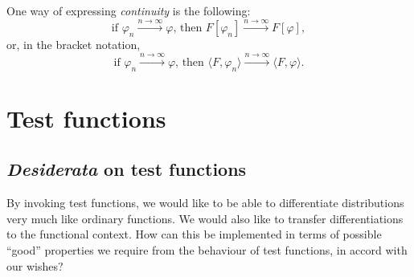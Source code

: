 One way of expressing {\em continuity} is
 the following:
\begin{equation}
\textrm{if }
\varphi_n \stackrel{n\rightarrow \infty}{\longrightarrow} \varphi
\textrm{, then }
F[\varphi_n ] \stackrel{n\rightarrow \infty}{\longrightarrow} F[\varphi  ],
\end{equation}
or, in the bracket notation,
\begin{equation}
\textrm{if }
\varphi_n \stackrel{n\rightarrow \infty}{\longrightarrow} \varphi
\textrm{, then }
\langle F ,    \varphi_n  \rangle \stackrel{n\rightarrow \infty}{\longrightarrow} \langle F ,    \varphi   \rangle .
\end{equation}


\section{Test functions}

\subsection{{\it Desiderata} on test functions}

By invoking test functions, we would like to be able to differentiate distributions very much like ordinary functions.
We would also like to transfer differentiations to the functional context.
How can this be implemented in terms of possible ``good'' properties we require from the behaviour of test functions, in accord with our wishes?

